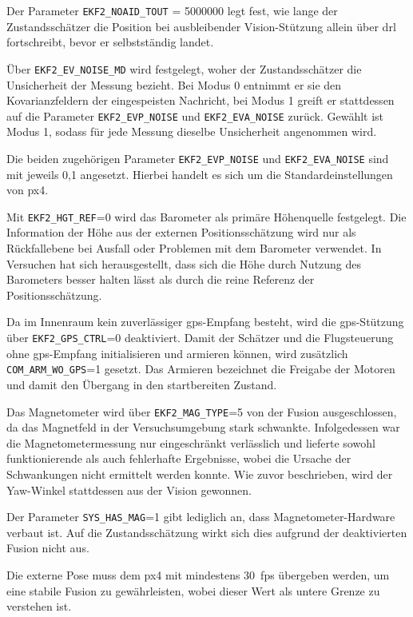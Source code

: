 Der Parameter \texttt{EKF2\_NOAID\_TOUT} = 5000000 legt fest, wie lange der Zustandsschätzer die Position bei ausbleibender Vision-Stützung allein über \gls{drl} fortschreibt, bevor er selbstständig landet.

Über \texttt{EKF2\_EV\_NOISE\_MD} wird festgelegt, woher der Zustandsschätzer die Unsicherheit der Messung bezieht.
Bei Modus 0 entnimmt er sie den Kovarianzfeldern der eingespeisten Nachricht, bei Modus 1 greift er stattdessen auf die Parameter \texttt{EKF2\_EVP\_NOISE} und \texttt{EKF2\_EVA\_NOISE} zurück.
Gewählt ist Modus 1, sodass für jede Messung dieselbe Unsicherheit angenommen wird.

Die beiden zugehörigen Parameter \texttt{EKF2\_EVP\_NOISE} und \texttt{EKF2\_EVA\_NOISE} sind mit jeweils 0,1 angesetzt.
Hierbei handelt es sich um die Standardeinstellungen von \gls{px4}.


Mit \texttt{EKF2\_HGT\_REF}=0 wird das Barometer als primäre Höhenquelle festgelegt.
Die Information der Höhe aus der externen Positionsschätzung wird nur als Rückfallebene bei Ausfall oder Problemen mit dem Barometer verwendet.
In Versuchen hat sich herausgestellt, dass sich die Höhe durch Nutzung des Barometers besser halten lässt als durch die reine Referenz der Positionsschätzung.


Da im Innenraum kein zuverlässiger \gls{gps}-Empfang besteht, wird die \gls{gps}-Stützung über \texttt{EKF2\_\allowbreak GPS\_\allowbreak CTRL}=0 deaktiviert.
Damit der Schätzer und die Flugsteuerung ohne \gls{gps}-Empfang initialisieren und armieren können, wird zusätzlich \texttt{COM\_ARM\_WO\_GPS}=1 gesetzt.
Das Armieren bezeichnet die Freigabe der Motoren und damit den Übergang in den startbereiten Zustand.

Das Magnetometer wird über \texttt{EKF2\_MAG\_TYPE}=5 von der Fusion ausgeschlossen, da das Magnetfeld in der Versuchsumgebung stark schwankte.
Infolgedessen war die Magnetometermessung nur eingeschränkt verlässlich und lieferte sowohl funktionierende als auch fehlerhafte Ergebnisse, wobei die Ursache der Schwankungen nicht ermittelt werden konnte.
Wie zuvor beschrieben, wird der Yaw-Winkel stattdessen aus der Vision gewonnen.

Der Parameter \texttt{SYS\_HAS\_MAG}=1 gibt lediglich an, dass Magnetometer-Hardware verbaut ist. 
Auf die Zustandsschätzung wirkt sich dies aufgrund der deaktivierten Fusion nicht aus.

Die externe Pose muss dem \gls{px4} mit mindestens 30~\gls{fps} übergeben werden, um eine stabile Fusion zu gewährleisten, wobei dieser Wert als untere Grenze zu verstehen ist.


